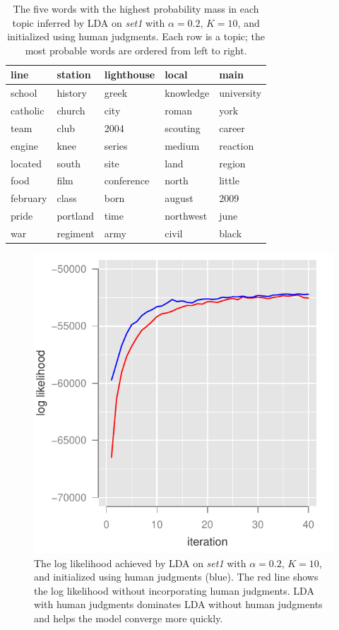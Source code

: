 \begin{table}
\footnotesize
\centering
\caption{The five words with the highest probability mass in each topic inferred by LDA on \emph{set1} with $\alpha = 0.2$, $K=10$, and initialized using human judgments. Each row is a topic; the most probable words are ordered from left to right.}
\label{tab:initialize}
\begin{tabular}{lllll}
  line & station & lighthouse & local & main \\ 
 \hline
  school & history & greek & knowledge & university \\ 
 \hline
  catholic & church & city & roman & york \\ 
 \hline
  team & club & 2004 & scouting & career \\ 
 \hline
  engine & knee & series & medium & reaction \\ 
 \hline
  located & south & site & land & region \\ 
 \hline
  food & film & conference & north & little \\ 
 \hline
  february & class & born & august & 2009 \\ 
 \hline
  pride & portland & time & northwest & june \\ 
 \hline
  war & regiment & army & civil & black \\   
\end{tabular}
\end{table}


\begin{figure}
\centering
\includegraphics[width=0.75\linewidth]{figures/human_initialized}
\caption{The log likelihood achieved by LDA on \emph{set1} with
  $\alpha = 0.2$, $K=10$, and initialized using human judgments
  (blue). The red line shows the log likelihood without incorporating
  human judgments.  LDA with human judgments dominates LDA without
  human judgments and helps the model converge more quickly.}
\label{fig:initialize}
\end{figure}

